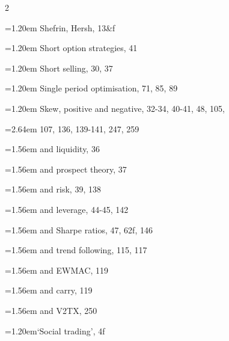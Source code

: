 {\begin{multicols}{2}
\par \noindent\hangindent=1.20em\hspace*{0.00em} Shefrin, Hersh, 13\&f
\par \noindent\hangindent=1.20em\hspace*{0.00em} Short option strategies, 41
\par \noindent\hangindent=1.20em\hspace*{0.00em} Short selling, 30, 37
\par \noindent\hangindent=1.20em\hspace*{0.00em} Single period optimisation, 71, 85, 89
\par \noindent\hangindent=1.20em\hspace*{0.00em} Skew, positive and negative, 32-34, 40-41, 48, 105,
\par \noindent\hangindent=2.64em\hspace*{1.44em} 107, 136, 139-141, 247, 259
\par \noindent\hangindent=1.56em\hspace*{0.36em} and liquidity, 36
\par \noindent\hangindent=1.56em\hspace*{0.36em} and prospect theory, 37
\par \noindent\hangindent=1.56em\hspace*{0.36em} and risk, 39, 138
\par \noindent\hangindent=1.56em\hspace*{0.36em} and leverage, 44-45, 142
\par \noindent\hangindent=1.56em\hspace*{0.36em} and Sharpe ratios, 47, 62f, 146
\par \noindent\hangindent=1.56em\hspace*{0.36em} and trend following, 115, 117
\par \noindent\hangindent=1.56em\hspace*{0.36em} and EWMAC, 119
\par \noindent\hangindent=1.56em\hspace*{0.36em} and carry, 119
\par \noindent\hangindent=1.56em\hspace*{0.36em} and V2TX, 250
\par \noindent\hangindent=1.20em\hspace*{0.00em}‘Social trading’, 4f

\end{multicols}}
